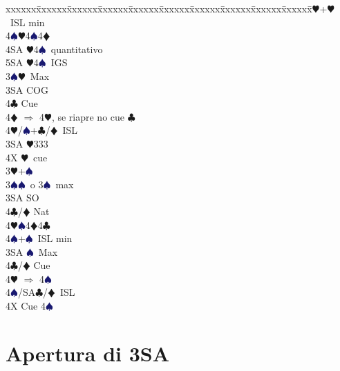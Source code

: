 \documentclass[a4paper,italian]{article}
\newcommand{\BC}{\textcolor{OliveGreen}{$\clubsuit$}}
\newcommand{\BD}{\textcolor{RedOrange}{$\vardiamondsuit$}}
\newcommand{\BH}{\textcolor{Red2}{$\varheartsuit${}}}
\newcommand{\BS}{\textcolor{MidnightBlue}{$\spadesuit${}}}
\newenvironment{bidtable}
{\begin{tabbing}

    xxxxxx\=xxxxxx\=xxxxxx\=xxxxxx\=xxxxxx\=xxxxxx\=xxxxxx\=xxxxxx\=xxxxxx\=xxxxxx\=\kill}
{\end{tabbing} }%
\begin{document}
\begin{multicols}{2}
\begin{bidtable}
        4\BH {}+\BH\ ISL min\\
        4\BS {}\BH 4\BS 4\BD \\
        4SA \BH 4\BS\ quantitativo\\
        5SA \BH 4\BS\ IGS\-\\
        3\BS {}\BH\ Max\+\\
        3SA\> COG\\
        4\BC\> Cue\\
        4\BD\> $\Rightarrow$ 4\BH, se riapre no cue \BC\\
        4\BH/\BS{}+\BC/\BD\ ISL\-\\
        3SA \BH 333\\
        4X \BH\ cue\-\\
        3\BH {}+\BS \+\\
        3\BS {}\BS\ o 3\BS\ max\+\\
        3SA \> SO\\
        4\BC/\BD \> Nat\\
        4\BH {}\BS 4\BD 4\BC \\
        4\BS {}+\BS\ ISL min\-\\
        3SA \BS\ Max\+\\
        4\BC/\BD\> Cue\\
        4\BH\> $\Rightarrow$ 4\BS\\
        4\BS/SA\BC/\BD\ ISL\-\\
        4X \> Cue 4\BS\\
    \end{bidtable}
\end{multicols}

\section{Apertura di 3SA}
\end{document}
